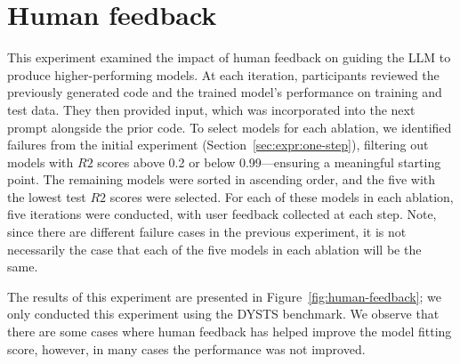 \documentclass{article}
\begin{document}
\newpage

\section{Human feedback}\label{app:human-feedback}

This experiment examined the impact of human feedback on guiding the LLM to produce higher-performing models. 
At each iteration, participants reviewed the previously generated code and the trained model's performance on training and test data. 
They then provided input, which was incorporated into the next prompt alongside the prior code. 
To select models for each ablation, we identified failures from the initial experiment (Section~\ref{sec:expr:one-step}), filtering out models with $R2$ scores above 0.2 or below 0.99—ensuring a meaningful starting point. 
The remaining models were sorted in ascending order, and the five with the lowest test $R2$ scores were selected. 
For each of these models in each ablation, five iterations were conducted, with user feedback collected at each step.
Note, since there are different failure cases in the previous experiment, it is not necessarily the case that each of the five models in each ablation will be the same.



The results of this experiment are presented in Figure~\ref{fig:human-feedback}; we only conducted this experiment using the DYSTS benchmark.
We observe that there are some cases where human feedback has helped improve the model fitting score, however, in many cases the performance was not improved.
\end{document}

